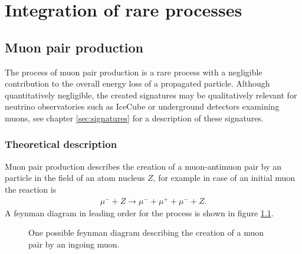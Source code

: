 \chapter{Integration of rare processes}

\section{Muon pair production}

The process of muon pair production is a rare process with a negligible contribution to the overall energy loss of a propagated particle.
Although quantitatively negligible, the created signatures may be qualitatively relevant for neutrino observatories such as IceCube or underground detectors examining muons, see chapter \ref{sec:signatures} for a description of these signatures.

\subsection{Theoretical description}

Muon pair production describes the creation of a muon-antimuon pair by an particle in the field of an atom nucleus $Z$, for example in case of an initial muon the reaction is
\begin{align*}
    \mu^- + Z \rightarrow \mu^- + \mu^+ + \mu^- + Z.
\end{align*}
A feynman diagram in leading order for the process is shown in figure \ref{fig:feynman_mupair}.

\begin{figure}
	\centering
	
    \caption{One possible feynman diagram describing the creation of a muon pair by an ingoing muon.}
    \label{fig:feynman_mupair}
\end{figure}

